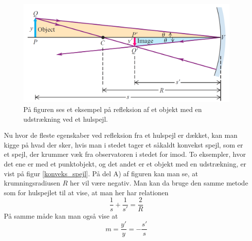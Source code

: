 \begin{figure}[h!]
	\centering
	\includegraphics[scale=0.27]{Geometrisk-Optik/spejl_krum_pil.PNG}
	\caption{På figuren ses et eksempel på refleksion af et objekt med en udstrækning ved et hulspejl.}
	\label{spejl_krum_pil}
\end{figure} 
Nu hvor de fleste egenskaber ved refleksion fra et hulspejl er dækket, kan man kigge på hvad der sker, hvis man i stedet tager et såkaldt konvekst spejl, som er et spejl, der krummer væk fra observatoren i stedet for imod. To eksempler, hvor det ene er med et punktobjekt, og det andet er et objekt med en udstrækning, er vist på figur \ref{konveks_spejl}. På del A) af figuren kan man se, at krumningsradiusen $R$ her vil være negativ. Man kan da bruge den samme metode som for hulspejlet til at vise, at man her har relationen
\begin{equation}
\frac{1}{s} + \frac{1}{s'} = \frac{2}{R}
\end{equation}
På samme måde kan man også vise at
\begin{equation}
m = \frac{y'}{y} = - \frac{s'}{s}
\label{ref_for_jacob}
\end{equation}

